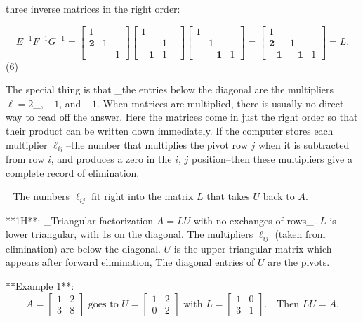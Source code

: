 three inverse matrices in the right order:

\[E^{-1}F^{-1}G^{-1}=\begin{bmatrix}1&&\\ \mathbf{2}&1&\\ &&1\end{bmatrix}\begin{bmatrix}1&&\\ &1&\\ -\mathbf{1}&1\end{bmatrix}\begin{bmatrix}1&&\\ &1&\\ &-\mathbf{1}&1\end{bmatrix}=\begin{bmatrix}1&&\\ \mathbf{2}&1&\\ -\mathbf{1}&-\mathbf{1}&1\end{bmatrix}=L.\] (6)

The special thing is that _the entries below the diagonal are the multipliers \(\ell=2\)_, \(-1\), and \(-1\). When matrices are multiplied, there is usually no direct way to read off the answer. Here the matrices come in just the right order so that their product can be written down immediately. If the computer stores each multiplier \(\ell_{ij}\)--the number that multiplies the pivot row \(j\) when it is subtracted from row \(i\), and produces a zero in the \(i\), \(j\) position--then these multipliers give a complete record of elimination.

_The numbers \(\ell_{ij}\) fit right into the matrix \(L\) that takes \(U\) back to \(A\)._

**1H**: _Triangular factorization \(A=LU\) with no exchanges of rows_. \(L\) is lower triangular, with 1s on the diagonal. The multipliers \(\ell_{ij}\) (taken from elimination) are below the diagonal. \(U\) is the upper triangular matrix which appears after forward elimination, The diagonal entries of \(U\) are the pivots.

**Example 1**: \[A=\begin{bmatrix}1&2\\ 3&8\end{bmatrix}\text{ goes to }U=\begin{bmatrix}1&2\\ 0&2\end{bmatrix}\text{ with }L=\begin{bmatrix}1&0\\ 3&1\end{bmatrix}.\quad\text{Then }LU=A.\]

